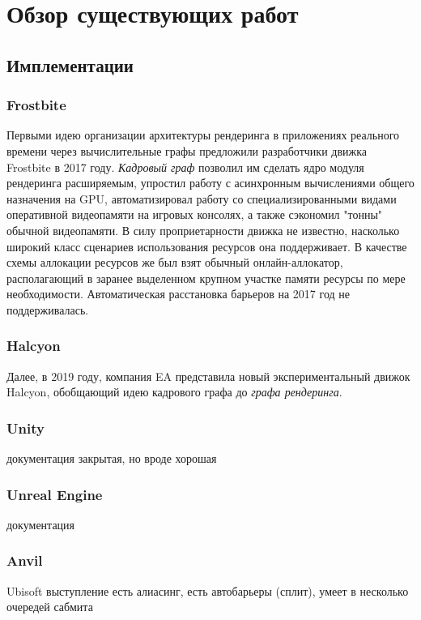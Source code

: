 \section{Обзор существующих работ}
\subsection{Имплементации}
\subsubsection*{Frostbite}
Первыми идею организации архитектуры рендеринга в приложениях реального времени через вычислительные графы предложили разработчики движка Frostbite в 2017 году\cite{FrostbiteGdcTalk}. \textit{Кадровый граф} позволил им сделать ядро модуля рендеринга расширяемым, упростил работу с асинхронным вычислениями общего назначения на GPU, автоматизировал работу со специализированными видами оперативной видеопамяти на игровых консолях, а также сэкономил "тонны" обычной видеопамяти. В силу проприетарности движка не известно, насколько широкий класс сценариев использования ресурсов она поддерживает. В качестве схемы аллокации ресурсов же был взят обычный онлайн-аллокатор, располагающий в заранее выделенном крупном участке памяти ресурсы по мере необходимости. Автоматическая расстановка барьеров на 2017 год не поддерживалась.

\subsubsection*{Halcyon}
Далее, в 2019 году, компания EA представила\cite{HalcyonRapidInnovationTalk} новый экспериментальный движок Halcyon, обобщающий идею кадрового графа до \textit{графа рендеринга}.

\subsubsection*{Unity}
документация\cite{UnityRenderGraph}
закрытая, но вроде хорошая

\subsubsection*{Unreal Engine}
документация\cite{UERenderDependencyGraph}

\subsubsection*{Anvil}
Ubisoft выступление\cite{DX12CaseStudies}
есть алиасинг, есть автобарьеры (сплит), умеет в несколько очередей сабмита

